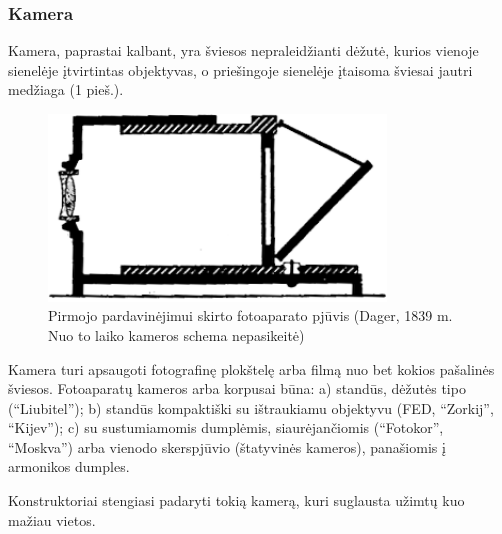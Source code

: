 \documentclass{book}
\begin{document}
				\subsubsection*{Kamera}
					Kamera, paprastai kalbant, yra šviesos nepraleidžianti dėžutė, kurios vienoje sienelėje įtvirtintas objektyvas, o priešingoje sienelėje įtaisoma šviesai jautri medžiaga (1 pieš.).
					\begin{figure}[h]
						\centering
						\includegraphics[width=0.8\textwidth]{1-pav}
						\caption{Pirmojo pardavinėjimui skirto fotoaparato pjūvis (Dager, 1839 m. Nuo to laiko kameros schema nepasikeitė)}
						\label{fig:1}
					\end{figure}
					Kamera turi apsaugoti fotografinę plokštelę arba filmą nuo bet kokios pašalinės šviesos. Fotoaparatų kameros arba korpusai būna: a) standūs, dėžutės tipo (``Liubitel''); b) standūs kompaktiški su ištraukiamu objektyvu (FED, ``Zorkij'', ``Kijev''); c) su sustumiamomis dumplėmis, siaurėjančiomis (``Fotokor'', ``Moskva'') arba vienodo skerspjūvio (štatyvinės kameros), panašiomis į armonikos dumples.

					Konstruktoriai stengiasi padaryti tokią kamerą, kuri suglausta užimtų kuo mažiau vietos.
\end{document}

